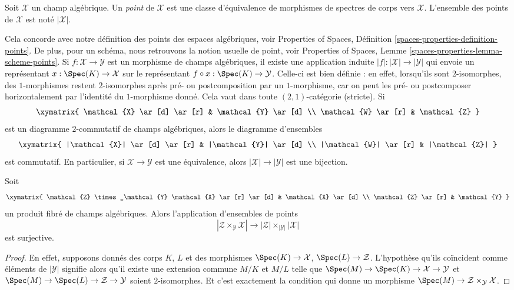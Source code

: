 \begin{definition}
\label{definition-points}
Soit $\mathcal{X}$ un champ algébrique.
Un {\it point} de $\mathcal{X}$ est une classe d'équivalence de morphismes
de spectres de corps vers $\mathcal{X}$.
L'ensemble des points de $\mathcal{X}$ est noté $|\mathcal{X}|$.
\end{definition}

\noindent
Cela concorde avec notre définition des points des espaces algébriques, voir
Properties of Spaces, Définition \ref{spaces-properties-definition-points}.
De plus, pour un schéma, nous retrouvons la notion usuelle de point, voir
Properties of Spaces, Lemme \ref{spaces-properties-lemma-scheme-points}.
Si $f : \mathcal{X} \to \mathcal{Y}$ est un morphisme de champs algébriques,
il existe une application induite $|f| : |\mathcal{X}| \to |\mathcal{Y}|$ qui
envoie un représentant $x : \Spec(K) \to \mathcal{X}$ sur le
représentant $f \circ x : \Spec(K) \to \mathcal{Y}$. Celle-ci est
bien définie : en effet, lorsqu'ils sont $2$-isomorphes, des $1$-morphismes restent $2$-isomorphes après
pré- ou postcomposition par un $1$-morphisme, car on peut les pré- ou postcomposer horizontalement
par l'identité du $1$-morphisme donné. Cela vaut
dans toute $(2, 1)$-catégorie (stricte). Si
$$
\xymatrix{
\mathcal{X} \ar[d] \ar[r] & \mathcal{Y} \ar[d] \\
\mathcal{W} \ar[r] & \mathcal{Z}
}
$$
est un diagramme $2$-commutatif de champs algébriques, alors le diagramme
d'ensembles
$$
\xymatrix{
|\mathcal{X}| \ar[d] \ar[r] & |\mathcal{Y}| \ar[d] \\
|\mathcal{W}| \ar[r] & |\mathcal{Z}|
}
$$
est commutatif.
En particulier, si $\mathcal{X} \to \mathcal{Y}$ est une équivalence,
alors $|\mathcal{X}| \to |\mathcal{Y}|$ est une bijection.

\begin{lemma}
\label{lemma-points-cartesian}
Soit
$$
\xymatrix{
\mathcal{Z} \times_\mathcal{Y} \mathcal{X} \ar[r] \ar[d] &
\mathcal{X} \ar[d] \\
\mathcal{Z} \ar[r] & \mathcal{Y}
}
$$
un produit fibré de champs algébriques. Alors l'application d'ensembles
de points
$$
|\mathcal{Z} \times_\mathcal{Y} \mathcal{X}|
\longrightarrow
|\mathcal{Z}| \times_{|\mathcal{Y}|} |\mathcal{X}|
$$
est surjective.
\end{lemma}

\begin{proof}
En effet, supposons donnés des corps $K$, $L$ et des morphismes
$\Spec(K) \to \mathcal{X}$, $\Spec(L) \to \mathcal{Z}$.
L'hypothèse qu'ils coïncident comme éléments de $|\mathcal{Y}|$ signifie alors
qu'il existe une extension commune $M/K$ et $M/L$
telle que
$\Spec(M) \to \Spec(K) \to \mathcal{X} \to \mathcal{Y}$ et
$\Spec(M) \to \Spec(L) \to \mathcal{Z} \to \mathcal{Y}$
soient $2$-isomorphes. Et c'est exactement la condition qui donne un
morphisme $\Spec(M) \to \mathcal{Z} \times_\mathcal{Y} \mathcal{X}$.
\end{proof}

